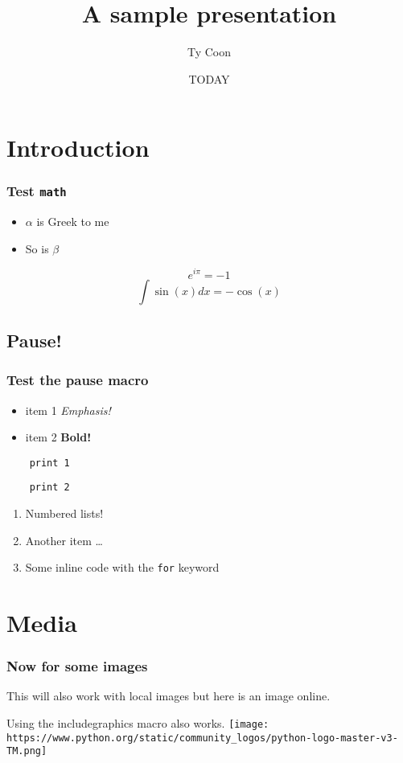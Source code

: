 \documentclass[14pt, compress]{beamer}
\title{A sample presentation }
\author{Ty Coon}
\date{TODAY}
\institute{Jobless Inc.}
\begin{document}
\begin{frame}
  \titlepage
\end{frame}

\section{Introduction}

\begin{frame}
  \frametitle{Test \texttt{math}}
  \begin{itemize}
  \item $\alpha$ is Greek to me
  \item So is $\beta$
  \end{itemize}
  \begin{equation*}
    e^{i\pi} = -1
  \end{equation*}
  \[ \int \sin(x) dx = -\cos(x)\]
\end{frame}

\subsection{Pause!}

\begin{frame}[fragile]
  \frametitle{Test the pause macro}
  \begin{itemize}
  \item item 1 \emph{Emphasis!}
    \pause
  \item item 2 \textbf{Bold!}
  \end{itemize}
  \begin{lstlisting}
    print 1
  \end{lstlisting}
  \pause
  \begin{verbatim}
    print 2
  \end{verbatim}

  \begin{enumerate}
  \item Numbered lists!
  \item Another item \ldots
  \item Some inline code with the \lstinline{for} keyword
  \end{enumerate}
\end{frame}

\section{Media}

\begin{frame}
  \frametitle{Now for some images}
  This will also work with local images but here is an image online.

  Using the includegraphics macro also works.
  \texttt{[image: https://www.python.org/static/community\_logos/python-logo-master-v3-TM.png]}
\end{frame}
\end{document}
